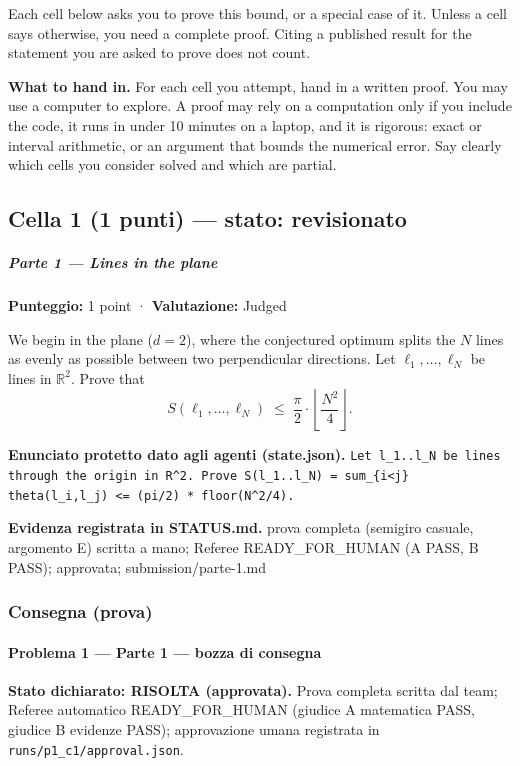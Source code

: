 \documentclass[11pt,a4paper]{article}
\begin{document}
Each cell below asks you to prove this bound, or a special case of it.
Unless a cell says otherwise, you need a complete proof. Citing a
published result for the statement you are asked to prove does not
count.

\textbf{What to hand in.} For each cell you attempt, hand in a written
proof. You may use a computer to explore. A proof may rely on a
computation only if you include the code, it runs in under 10 minutes on
a laptop, and it is rigorous: exact or interval arithmetic, or an
argument that bounds the numerical error. Say clearly which cells you
consider solved and which are partial.

\subsection{Cella 1 (1 punti) — stato: revisionato}
\subparagraph{Parte 1 --- Lines in the
plane}\label{parte-1-lines-in-the-plane}

\textbf{Punteggio:} 1 point · \textbf{Valutazione:} Judged

We begin in the plane (\(d = 2\)), where the conjectured optimum splits
the \(N\) lines as evenly as possible between two perpendicular
directions. Let \(\ell_1, \ldots, \ell_N\) be lines in \(\mathbb{R}^2\).
Prove that \[
S(\ell_1, \ldots, \ell_N) \;\le\; \frac{\pi}{2} \cdot \left\lfloor \frac{N^2}{4} \right\rfloor .
\]

\textbf{Enunciato protetto dato agli agenti (state.json).} \texttt{Let l\_1..l\_N be lines through the origin in R\textasciicircum{}2. Prove S(l\_1..l\_N) = sum\_\{i\textless{}j\} theta(l\_i,l\_j) \textless{}= (pi/2) * floor(N\textasciicircum{}2/4).}

\textbf{Evidenza registrata in STATUS.md.} prova completa (semigiro casuale, argomento E) scritta a mano; Referee READY\_FOR\_HUMAN (A PASS, B PASS); approvata; submission/parte-1.md

\subsubsection{Consegna (prova)}
\paragraph{Problema 1 --- Parte 1 --- bozza di
consegna}\label{problema-1-parte-1-bozza-di-consegna}

\textbf{Stato dichiarato: RISOLTA (approvata).} Prova completa scritta
dal team; Referee automatico READY\_FOR\_HUMAN (giudice A matematica
PASS, giudice B evidenze PASS); approvazione umana registrata in
\texttt{runs/p1\_c1/approval.json}.
\end{document}

